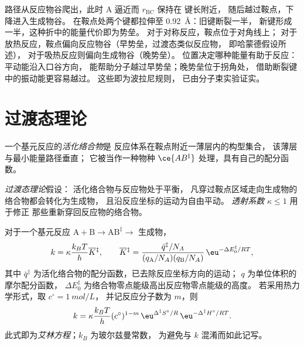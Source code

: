 路径从反应物谷爬出，此时 A 逼近而 $r_{\mathrm{BC}}$ 保持在  键长附近，
随后越过鞍点，下降进入生成物谷。
在鞍点处两个键都拉伸至 \qty{0.92}{\angstrom}：旧键断裂一半，
新键形成一半，这种折中的能量代价即为势垒。
对于对称反应，鞍点位于对角线上；
对于放热反应，鞍点偏向反应物谷（早势垒，过渡态类似反应物，
即哈蒙德假设所述），
对于吸热反应则偏向生成物谷（晚势垒）。
位置决定哪种能量有助于反应：平动能沿入口谷方向，
能帮助分子越过早势垒；晚势垒位于拐角处，
借助断裂键中的振动能更容易越过。
这些即为波拉尼规则，
已由分子束实验证实。

\section{过渡态理论}

\begin{definition}[活化络合物]\label{def:b3:rate-theories:activated-complex}
一个基元反应的\emph{活化络合物}是
反应体系在鞍点附近一薄层内的构型集合，
该薄层与最小能量路径垂直；
它被当作一种物种 $\ce{AB^{\ddagger}}$ 处理，具有自己的配分函数。
\end{definition}

\begin{definition}\label{def:b3:rate-theories:tst}
\emph{过渡态理论}假设：
活化络合物与反应物处于平衡，
凡穿过鞍点区域走向生成物的络合物都会转化为生成物，
且沿反应坐标的运动为自由平动。
\emph{透射系数} $\kappa \le 1$ 用于修正
那些重新穿回反应物的络合物。
\end{definition}

\begin{theorem}[艾林方程]\label{thm:b3:rate-theories:eyring}
对于一个基元反应 $\mathrm{A + B} \to \mathrm{AB}^{\ddagger} \to$ 生成物，
\[
  k = \kappa\frac{k_BT}{h}\overline{K}{}^{\ddagger}, \qquad
  \overline{K}{}^{\ddagger} = \frac{\bar q^{\ddagger}/N_A}{(q_{\mathrm A}/N_A)(q_{\mathrm B}/N_A)}\,\eu^{-\Delta E_0^{\ddagger}/RT},
\]
其中 $\bar q^{\ddagger}$ 为活化络合物的配分函数，已去除反应坐标方向的运动；
$q$ 为单位体积的摩尔配分函数，
$\Delta E_0^{\ddagger}$ 为络合物零点能级高出反应物零点能级的高度。
若采用热力学形式，取 $c^\circ = \qty{1}{mol/L}$，
并记反应分子数为 $m$，则
\[
  k = \kappa\frac{k_BT}{h}(c^\circ)^{1-m}\,\eu^{\Delta^{\ddagger}S^\circ/R}\,\eu^{-\Delta^{\ddagger}H^\circ/RT}.
\]
此式即为\emph{艾林方程}；$k_B$ 为玻尔兹曼常数，
为避免与 $k$ 混淆而如此记写。
\end{theorem}

